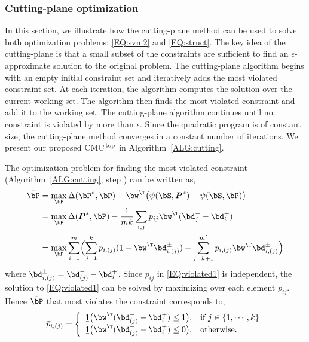 \documentclass[10pt,twocolumn,letterpaper]{article}
\def\ctwo{{\ding{173}}}
\def\bPbar{{\bar{\bP}}}
\def\mprime{{m^{\prime}}}
\def\bdip{{\bd_{i}^{+}}}
\def\bdjm{{\bd_{j}^{-}}}
\def\bdjbm{{\bd_{(j)}^{-}}}
\def\bPast{{{\boldsymbol P}^{\ast}}}
\def\CMCstruct{{\rm CMC$^{\,\rm top}$}\xspace}
\begin{document}
%
\subsubsection{Cutting-plane optimization}
%
In this section, we illustrate how the cutting-plane
method can be used to
solve both optimization problems: \eqref{EQ:svm2} and
\eqref{EQ:struct}.
%
The key idea of the cutting-plane is that
a small subset of the constraints are sufficient to find an
$\epsilon$-approximate solution to the original problem.
%
The cutting-plane algorithm begins with an empty initial
constraint set and iteratively adds the most violated constraint set.
At each iteration, the algorithm computes the solution
over the current working set.
The algorithm then finds the most violated constraint
and add it to the working set.
The cutting-plane algorithm continues until no constraint is violated
by more than $\epsilon$.
Since the quadratic program is of constant size, the cutting-plane method
converges in a constant number of iterations.
%
%
%
%
%
We present our proposed \CMCstruct in Algorithm~\ref{ALG:cutting}.

The optimization problem for finding the most violated constraint
(Algorithm~\ref{ALG:cutting}, step \ctwo) can be written as,
%
\begin{align}
    \label{EQ:violated1}
    \bPbar &= \max_{ \bP }  \Delta (\bP^{\ast}, \bP) -
                \bw^\T \bigl( \psi(\bS, \bPast) - \psi(\bS, \bP) \bigr) \\ \notag
           &= \max_{ \bP }  \Delta (\bPast, \bP) - \frac{1}{mk}
         \sum_{i,j}  p_{ij} \bw^\T (\bdjm - \bdip ) \\ \notag
           &= \max_{ \bP } \sum_{i=1}^m \Bigl(
                 \sum_{j=1}^k p_{i,(j)} (1-\bw^\T \bd_{i,(j)}^{\pm}  )
               - \sum_{j=k+1}^\mprime p_{i,(j)} \bw^\T \bd_{i,(j)}^{\pm} \Bigr)
\end{align}
%
%
where $\bd_{i,(j)}^{\pm} = \bdjbm - \bdip$.
%
Since $p_{ij}$ in \eqref{EQ:violated1} is independent,
the solution to \eqref{EQ:violated1} can be solved by maximizing over
each element $p_{ij}$.
Hence $\bPbar$ that most violates the constraint corresponds to,
%
\begin{align}
  \bar{p}_{i,(j)} = \left\{ \begin{array}{ll}
  \b1 \bigl( \bw^\T (\bdjbm - \bdip) \leq 1 \bigr) , &\mbox{{if   }} j \in \{ 1, \cdots, k \} \\
  \b1 \bigl( \bw^\T (\bdjbm - \bdip) \leq 0 \bigr), &\mbox{{otherwise.}}
\end{array} \right. \notag
\end{align}
\end{document}
